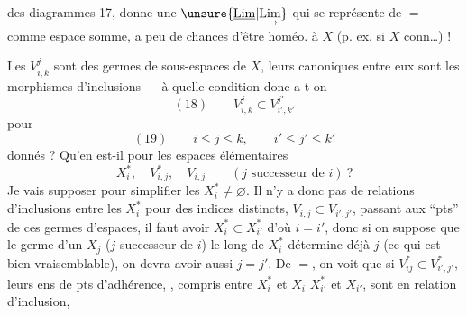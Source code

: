 des diagrammes 17, donne une $\unsure{\underline{\mathrm{Lim}}|\underset{\longrightarrow}{\mathrm{Lim}}}$ qui se représente de $=$ comme espace somme, a peu de chances d'être homéo. à $X$ (p. ex. si $X$ conn\ldots) !

Les $V_{i,k}^j$ sont des germes de sous-espaces de $X$, leurs    canoniques entre eux sont les morphismes d'inclusions — à quelle condition donc a-t-on
\[
(18)\qquad V_{i,k}^j\subset V_{i',k'}^{j'}
\]
pour
\[
(19)\qquad i\leq j\leq k,\qquad i'\leq j'\leq k'
\]
donnés ? Qu'en est-il pour les espaces élémentaires
\[
X_i^*,\quad V_{i,j}^*,\quad V_{i,j}\qquad(j\text{ successeur de }i)\ ?
\]
Je vais supposer pour simplifier les $X_i^*\ne\varnothing$.
Il n'y a donc pas de relations d'inclusions entre les $X_i^*$ pour des indices distincts,   $V_{i,j}\subset V_{i',j'}$, passant aux ``pts''  de ces germes d'espaces, il faut avoir $X_i^*\subset X_{i'}^*$ d'où $i=i'$, donc si on suppose que le germe d'un $X_j$ ($j$ successeur de $i$) le long de $X_i^*$ détermine déjà $j$ (ce qui est bien vraisemblable), on devra avoir aussi $j=j'$. De $=$, on voit que si $V_{ij}^*\subset V_{i',j'}^*$, leurs ens de pts d'adhérence, , compris entre $\overline{X_i^*}$ et $X_i$  $\overline{X_{i'}^*}$ et $X_{i'}$, sont en relation d'inclusion,
